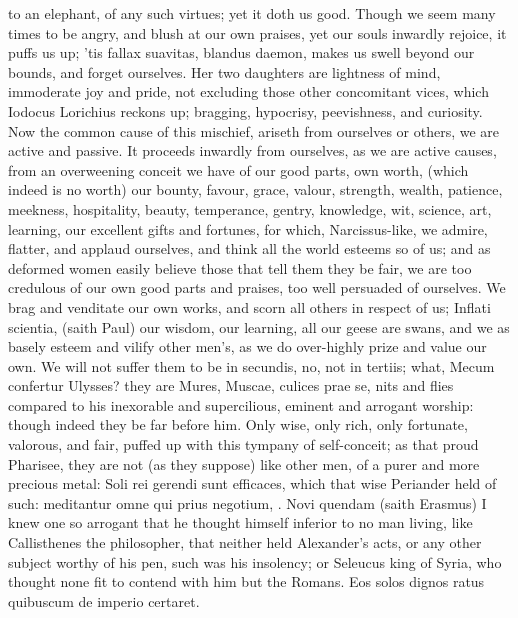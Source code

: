 {to an elephant, of any such virtues; yet it doth us good. Though we
seem many times to be angry,  and blush at our own praises, yet
our souls inwardly rejoice, it puffs us up; 'tis fallax suavitas,
blandus daemon, makes us swell beyond our bounds, and forget ourselves.
Her two daughters are lightness of mind, immoderate joy and pride, not
excluding those other concomitant vices, which Iodocus Lorichius
reckons up; bragging, hypocrisy, peevishness, and curiosity.
Now the common cause of this mischief, ariseth from ourselves or
others, we are active and passive. It proceeds inwardly from
ourselves, as we are active causes, from an overweening conceit we have
of our good parts, own worth, (which indeed is no worth) our bounty,
favour, grace, valour, strength, wealth, patience, meekness,
hospitality, beauty, temperance, gentry, knowledge, wit, science, art,
learning, our  excellent gifts and fortunes, for which,
Narcissus-like, we admire, flatter, and applaud ourselves, and think
all the world esteems so of us; and as deformed women easily believe
those that tell them they be fair, we are too credulous of our own good
parts and praises, too well persuaded of ourselves. We brag and
venditate our own works, and scorn all others in respect of us;
Inflati scientia, (saith Paul) our wisdom, our learning, all our
geese are swans, and we as basely esteem and vilify other men's, as we
do over-highly prize and value our own. We will not suffer them to be
in secundis, no, not in tertiis; what, Mecum confertur Ulysses? they
are Mures, Muscae, culices prae se, nits and flies compared to his
inexorable and supercilious, eminent and arrogant worship: though
indeed they be far before him. Only wise, only rich, only fortunate,
valorous, and fair, puffed up with this tympany of self-conceit;
as that proud Pharisee, they are not (as they suppose) like other
men, of a purer and more precious metal: Soli rei gerendi sunt
efficaces, which that wise Periander held of such: meditantur
omne qui prius negotium, \etc{}. Novi quendam (saith Erasmus) I knew
one so arrogant that he thought himself inferior to no man living, like
Callisthenes the philosopher, that neither held Alexander's acts,
or any other subject worthy of his pen, such was his insolency; or
Seleucus king of Syria, who thought none fit to contend with him but
the Romans. Eos solos dignos ratus quibuscum de imperio certaret.
}
